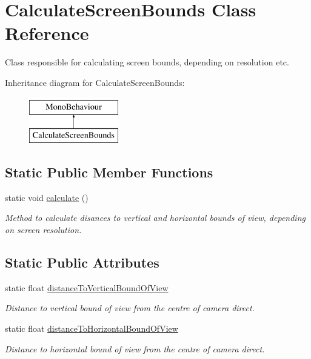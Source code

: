 \hypertarget{class_calculate_screen_bounds}{}\section{Calculate\+Screen\+Bounds Class Reference}
\label{class_calculate_screen_bounds}


Class responsible for calculating screen bounds, depending on resolution etc.  


Inheritance diagram for Calculate\+Screen\+Bounds\+:\begin{figure}[H]
\begin{center}
\leavevmode
\includegraphics[height=2.000000cm]{class_calculate_screen_bounds}
\end{center}
\end{figure}
\subsection*{Static Public Member Functions}
\begin{DoxyCompactItemize}
\item 
static void \mbox{\hyperlink{class_calculate_screen_bounds_a158fa098e4529b299f223bb0e241ccc8}{calculate}} ()
\begin{DoxyCompactList}\small\item\em Method to calculate disances to vertical and horizontal bounds of view, depending on screen resolution. \end{DoxyCompactList}\end{DoxyCompactItemize}
\subsection*{Static Public Attributes}
\begin{DoxyCompactItemize}
\item 
static float \mbox{\hyperlink{class_calculate_screen_bounds_ae23c6986f2ecddbfd38c00c7bfc6855f}{distance\+To\+Vertical\+Bound\+Of\+View}}
\begin{DoxyCompactList}\small\item\em Distance to vertical bound of view from the centre of camera direct. \end{DoxyCompactList}\item 
static float \mbox{\hyperlink{class_calculate_screen_bounds_a439f514c9f28391b0b90ad9b8050e35a}{distance\+To\+Horizontal\+Bound\+Of\+View}}
\begin{DoxyCompactList}\small\item\em Distance to horizontal bound of view from the centre of camera direct. \end{DoxyCompactList}\end{DoxyCompactItemize}


